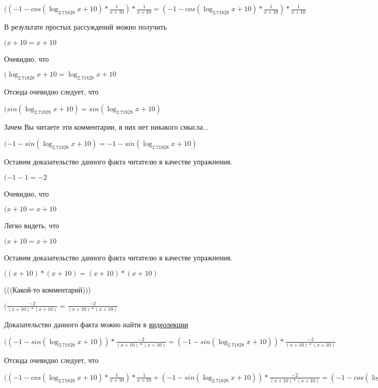 \documentclass[12pt,a4paper,fleqn]{article}
\theoremstyle{definition}
\begin{document}
$(( -1  - cos(\log_{ 2.71828 }{ x  +  10 }) * \frac{ 1 }{ x  +  10 }
) * \frac{ 1 }{ x  +  10 }
 = ( -1  - cos(\log_{ 2.71828 }{ x  +  10 }) * \frac{ 1 }{ x  +  10 }
) * \frac{ 1 }{ x  +  10 }
$

В результате простых рассуждений можно получить

$( x  +  10  =  x  +  10 $

Очевидно, что

$(\log_{ 2.71828 }{ x  +  10 } = \log_{ 2.71828 }{ x  +  10 }$

Отсюда очевидно следует, что

$(sin(\log_{ 2.71828 }{ x  +  10 }) = sin(\log_{ 2.71828 }{ x  +  10 })$

Зачем Вы читаете эти комментарии, в них нет никакого смысла...

$( -1  - sin(\log_{ 2.71828 }{ x  +  10 }) =  -1  - sin(\log_{ 2.71828 }{ x  +  10 })$

Оставим доказательство данного факта читателю в качестве упражнения.

$( -1  -  1  =  -2 $

Очевидно, что

$( x  +  10  =  x  +  10 $

Легко видеть, что

$( x  +  10  =  x  +  10 $

Оставим доказательство данного факта читателю в качестве упражнения.

$(( x  +  10 ) * ( x  +  10 ) = ( x  +  10 ) * ( x  +  10 )$

(((Какой-то комментарий)))

$(\frac{ -2 }{( x  +  10 ) * ( x  +  10 )}
 = \frac{ -2 }{( x  +  10 ) * ( x  +  10 )}
$

Доказательство данного факта можно найти в \href{https://www.youtube.com/watch?v=dQw4w9WgXcQ}{видеолекции}

$(( -1  - sin(\log_{ 2.71828 }{ x  +  10 })) * \frac{ -2 }{( x  +  10 ) * ( x  +  10 )}
 = ( -1  - sin(\log_{ 2.71828 }{ x  +  10 })) * \frac{ -2 }{( x  +  10 ) * ( x  +  10 )}
$

Отсюда очевидно следует, что

$(( -1  - cos(\log_{ 2.71828 }{ x  +  10 }) * \frac{ 1 }{ x  +  10 }
) * \frac{ 1 }{ x  +  10 }
 + ( -1  - sin(\log_{ 2.71828 }{ x  +  10 })) * \frac{ -2 }{( x  +  10 ) * ( x  +  10 )}
 = ( -1  - cos(\log_{ 2.71828 }{ x  +  10 }) * \frac{ 1 }{ x  +  10 }
) * \frac{ 1 }{ x  +  10 }
 + ( -1  - sin(\log_{ 2.71828 }{ x  +  10 })) * \frac{ -2 }{( x  +  10 ) * ( x  +  10 )}
$
\end{document}
